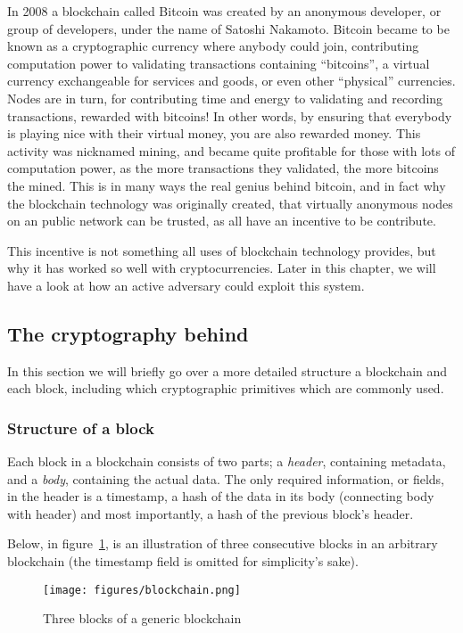 In 2008 a blockchain called Bitcoin was created by an anonymous
developer, or group of developers, under the name of Satoshi Nakamoto.
Bitcoin became to be known as a cryptographic currency where anybody
could join, contributing computation power to validating transactions
containing ``bitcoins'', a virtual currency exchangeable for services
and goods, or even other ``physical'' currencies. Nodes are in turn,
for contributing time and energy to validating and recording
transactions, rewarded with bitcoins! In other words, by ensuring that
everybody is playing nice with their virtual money, you are also
rewarded money. This activity was nicknamed mining, and became quite
profitable for those with lots of computation power, as the more
transactions they validated, the more bitcoins the mined. This is in
many ways the real genius behind bitcoin, and in fact why the
blockchain technology was originally created, that virtually anonymous
nodes on an public network can be trusted, as all have an incentive to
be contribute.

This incentive is not something all uses of blockchain technology
provides, but why it has worked so well with cryptocurrencies. Later
in this chapter, we will have a look at how an active adversary could
exploit this system.


\subsection{The cryptography behind}
In this section we will briefly go over a more detailed structure a
blockchain and each block, including which cryptographic primitives
which are commonly used.

\subsubsection{Structure of a block}
Each block in a blockchain consists of two parts; a \textit{header},
containing metadata, and a \textit{body}, containing the actual data.
The only required information, or fields, in the header is a
timestamp, a hash of the data in its body (connecting body with
header) and most importantly, a hash of the previous block's header.

Below, in figure~\ref{fig:blockchain}, is an illustration of three
consecutive blocks in an arbitrary blockchain (the timestamp field is
omitted for simplicity's sake).
\begin{figure}[H]
  \centering
  \texttt{[image: figures/blockchain.png]}
  \caption{\label{fig:blockchain} Three blocks of a generic blockchain}
\end{figure}

